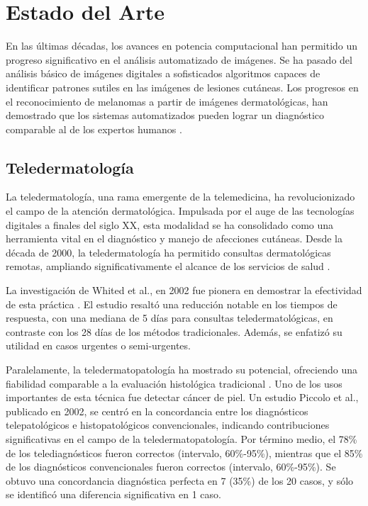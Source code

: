 \chapter{Estado del Arte}\label{chapter:state-of-the-art}

En las últimas décadas, los avances en potencia computacional han permitido un progreso significativo en el análisis automatizado de imágenes. Se ha pasado del análisis básico de imágenes digitales a sofisticados algoritmos capaces de identificar patrones sutiles en las imágenes de lesiones cutáneas. Los progresos en el reconocimiento de melanomas a partir de imágenes dermatológicas, han demostrado que los sistemas automatizados pueden lograr un diagnóstico comparable al de los expertos humanos .   

\section{Teledermatología}

La teledermatología, una rama emergente de la telemedicina, ha revolucionizado el campo de la atención dermatológica. Impulsada por el auge de las tecnologías digitales a finales del siglo XX, esta modalidad se ha consolidado como una herramienta vital en el diagnóstico y manejo de afecciones cutáneas. Desde la década de 2000, la teledermatología ha permitido consultas dermatológicas remotas, ampliando significativamente el alcance de los servicios de salud .

La investigación de Whited et al., en 2002 fue pionera en demostrar la efectividad de esta práctica . El estudio resaltó una reducción notable en los tiempos de respuesta, con una mediana de 5 días para consultas teledermatológicas, en contraste con los 28 días de los métodos tradicionales. Además, se enfatizó su utilidad en casos urgentes o semi-urgentes.

Paralelamente, la teledermatopatología ha mostrado su potencial, ofreciendo una fiabilidad comparable a la evaluación histológica tradicional . Uno de los usos importantes de esta técnica fue detectar cáncer de piel. Un estudio Piccolo et al.,  publicado en 2002, se centró en la concordancia entre los diagnósticos telepatológicos e histopatológicos convencionales, indicando contribuciones significativas en el campo de la teledermatopatología. Por término medio, el 78\% de los telediagnósticos fueron correctos (intervalo, 60\%-95\%), mientras que el 85\% de los diagnósticos convencionales fueron correctos (intervalo, 60\%-95\%). Se obtuvo una concordancia diagnóstica perfecta en 7 (35\%) de los 20 casos, y sólo se identificó una diferencia significativa en 1 caso.


